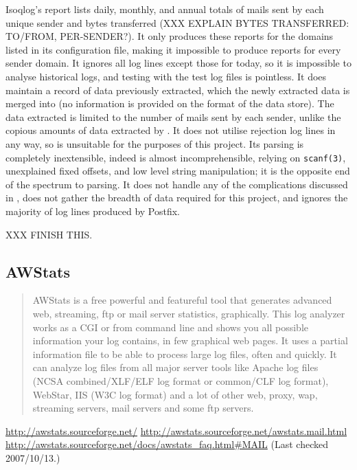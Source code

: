 Isoqlog's report lists daily, monthly, and annual totals of mails sent by
each unique sender and bytes transferred (XXX EXPLAIN BYTES TRANSFERRED\@:
TO/FROM, PER-SENDER\@?).  It only produces these reports for the domains
listed in its configuration file, making it impossible to produce reports
for every sender domain.  It ignores all log lines except those for today,
so it is impossible to analyse historical logs, and testing with the
\numberOFlogFILES{} test log files is pointless.  It does maintain a record
of data previously extracted, which the newly extracted data is merged into
(no information is provided on the format of the data store).  The data
extracted is limited to the number of mails sent by each sender, unlike the
copious amounts of data extracted by \parsername{}.  It does not utilise
rejection log lines in any way, so is unsuitable for the purposes of this
project.  Its parsing is completely inextensible, indeed is almost
incomprehensible, relying on \texttt{scanf(3)}, unexplained fixed offsets,
and low level string manipulation; it is the opposite end of the spectrum
to \parsernames{} parsing.  It does not handle any of the complications
discussed in , does not gather the breadth of
data required for this project, and ignores the majority of log lines
produced by Postfix.

XXX FINISH THIS\@.

\subsection{AWStats}

\begin{quotation}

    AWStats is a free powerful and featureful tool that generates advanced
    web, streaming, ftp or mail server statistics, graphically. This log
    analyzer works as a CGI or from command line and shows you all possible
    information your log contains, in few graphical web pages. It uses a
    partial information file to be able to process large log files, often
    and quickly. It can analyze log files from all major server tools like
    Apache log files (NCSA combined/XLF/ELF log format or common/CLF log
    format), WebStar, IIS (W3C log format) and a lot of other web, proxy,
    wap, streaming servers, mail servers and some ftp servers.

\end{quotation}

\noindent{}\url{http://awstats.sourceforge.net/} \newline{}
\url{http://awstats.sourceforge.net/awstats.mail.html} \newline{}
\url{http://awstats.sourceforge.net/docs/awstats_faq.html#MAIL} \newline{}
(Last checked 2007/10/13.)

